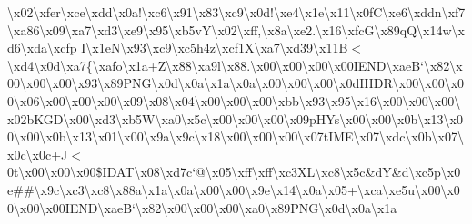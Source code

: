 \textbackslash{}x02\textbackslash{}xfer\textbackslash{}xce\textbackslash{}xdd\textbackslash{}x0a!\textbackslash{}xc6\textbackslash{}x91\textbackslash{}x83\textbackslash{}xc9\textbackslash{}x0d!\textbackslash{}xe4\textbackslash{}x1e\textbackslash{}x11\textbackslash{}x0f\+C\textbackslash{}xe6\textbackslash{}xddn\textbackslash{}xf7\textbackslash{}xa86\textbackslash{}x09\textbackslash{}xa7\textbackslash{}xd3\textbackslash{}xe9\textbackslash{}x95\textbackslash{}xb5v\+Y\textbackslash{}x02\textbackslash{}xff,\textbackslash{}x8a\textbackslash{}xe2.\textbackslash{}x16\textbackslash{}xfc\+G\textbackslash{}x89q\+Q\textbackslash{}x14w\textbackslash{}xd6\textbackslash{}xda\textbackslash{}xcfp I\textbackslash{}x1e\+N\textquotesingle{}\textbackslash{}x93\textbackslash{}xc9\textbackslash{}xc5h4z\textbackslash{}xcf1\+X\textbackslash{}xa7\textbackslash{}xd39\textbackslash{}x11\+B$<$\textbackslash{}xd4\textbackslash{}x0d\textbackslash{}xa7\{\textbackslash{}xafo\textbackslash{}x1a+\+Z\textbackslash{}x88\textbackslash{}xa9l\textbackslash{}x88.\textbackslash{}x00\textbackslash{}x00\textbackslash{}x00\textbackslash{}x00\+I\+E\+N\+D\textbackslash{}xae\+B`\textbackslash{}x82\textbackslash{}x00\textbackslash{}x00\textbackslash{}x00\textbackslash{}x93\textbackslash{}x89\+P\+N\+G\textbackslash{}x0d\textbackslash{}x0a\textbackslash{}x1a\textbackslash{}x0a\textbackslash{}x00\textbackslash{}x00\textbackslash{}x00\textbackslash{}x0d\+I\+H\+D\+R\textbackslash{}x00\textbackslash{}x00\textbackslash{}x00\textbackslash{}x06\textbackslash{}x00\textbackslash{}x00\textbackslash{}x00\textbackslash{}x09\textbackslash{}x08\textbackslash{}x04\textbackslash{}x00\textbackslash{}x00\textbackslash{}x00\textbackslash{}xbb\textbackslash{}x93\textbackslash{}x95\textbackslash{}x16\textbackslash{}x00\textbackslash{}x00\textbackslash{}x00\textbackslash{}x02b\+K\+G\+D\textbackslash{}x00\textbackslash{}xd3\textbackslash{}xb5\+W\textbackslash{}xa0\textbackslash{}x5c\textbackslash{}x00\textbackslash{}x00\textbackslash{}x00\textbackslash{}x09p\+H\+Ys\textbackslash{}x00\textbackslash{}x00\textbackslash{}x0b\textbackslash{}x13\textbackslash{}x00\textbackslash{}x00\textbackslash{}x0b\textbackslash{}x13\textbackslash{}x01\textbackslash{}x00\textbackslash{}x9a\textbackslash{}x9c\textbackslash{}x18\textbackslash{}x00\textbackslash{}x00\textbackslash{}x00\textbackslash{}x07t\+I\+M\+E\textbackslash{}x07\textbackslash{}xdc\textbackslash{}x0b\textbackslash{}x07\textbackslash{}x0c\textbackslash{}x0c+\+J$<$0t\textbackslash{}x00\textbackslash{}x00\textbackslash{}x00\$\+I\+D\+A\+T\textbackslash{}x08\textbackslash{}xd7c`@\textbackslash{}x05\textbackslash{}xff\textbackslash{}xff\textbackslash{}xc3\+X\+L\textbackslash{}xc8\textbackslash{}x5c\&d\+Y\&d\textbackslash{}xc5p\textbackslash{}x0e\#\#\textbackslash{}x9c\textbackslash{}xc3\textbackslash{}xc8\textbackslash{}x88a\textbackslash{}x1a\textbackslash{}x0a\textbackslash{}x00\textbackslash{}x00\textbackslash{}x9e\textbackslash{}x14\textbackslash{}x0a\textbackslash{}x05+\textbackslash{}xca\textbackslash{}xe5u\textbackslash{}x00\textbackslash{}x00\textbackslash{}x00\textbackslash{}x00\+I\+E\+N\+D\textbackslash{}xae\+B`\textbackslash{}x82\textbackslash{}x00\textbackslash{}x00\textbackslash{}x00\textbackslash{}xa0\textbackslash{}x89\+P\+N\+G\textbackslash{}x0d\textbackslash{}x0a\textbackslash{}x1a\textback
